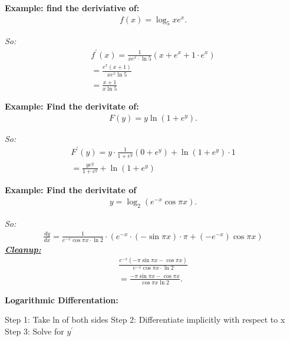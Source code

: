 \documentclass{report}
\begin{document}
  \bigbreak \noindent 
  \begin{mdframed}
    \textbf{Example: find the deriviative of: }
    \begin{align*}
      f(x) = \log_5{xe^{x}}
    .\end{align*}
  \end{mdframed}
  \bigbreak \noindent
  \textit{So:}
  \begin{align*}
    f^{\prime}(x) = \frac{1}{xe^{x}\cdot \ln{5}} (x+e^{x}+1\cdot e^{x}) \\ 
    = \frac{e^{x}(x+1)}{xe^{x}\ln{5}} \\ 
    = \frac{x+1}{x\ln{5}}
  \end{align*}

  \bigbreak \noindent 
  \begin{mdframed}
    \textbf{Example: Find the derivitate of:}
    \begin{align*}
      F(y) = y\ln{(1+e^{y})}
    .\end{align*}
  \end{mdframed}
  \bigbreak \noindent
  \textit{So:}
  \begin{align*}
   F^{\prime}(y) = y \cdot \frac{1}{1+e^{y}} (0+e^{y})  + \ln{(1+e^{y})} \cdot 1 \\ 
   = \frac{ye^{y}}{1+e^{y}} + \ln{(1+e^{y})}
  \end{align*}
  \bigbreak \noindent 

  \bigbreak \noindent 
  \begin{mdframed}
    \textbf{Example: Find the derivitate of}
    \begin{align*}
      y = \log_2{(e^{-x}\cos{\pi x})}
    .\end{align*}
  \end{mdframed}
  \bigbreak \noindent
  \textit{So:}
  \begin{align*}
    \frac{dy}{dx} = \frac{1}{e^{-x}\cos{\pi x} \cdot \ln{2}} \cdot (e^{-x} \cdot (-\sin{\pi x}) \cdot \pi + (-e^{-x}) \cos{\pi x}) 
  \end{align*}
  \bigbreak \noindent 
  \textbf{\textit{\underline{Cleanup:}}}
  \begin{align*}
    \frac{e^{-x}(-\pi \sin{\pi x} - \cos{\pi x})}{e^{-x}\cos{\pi x} \cdot \ln{2}} \\
    = \frac{-\pi \sin{\pi x} - \cos{\pi x}}{\cos{\pi x} \ln{2}}
  .\end{align*}
  
  \pagebreak \bigbreak \noindent
  \begin{large}
    \textbf{Logarithmic Differentation:}
  \end{large}
  \bigbreak \noindent 
  Step 1: Take ln of both sides 
  \bigbreak \noindent 
  Step 2: Differentiate implicitly with respect to x
  \bigbreak \noindent 
  Step 3: Solve for $y^{\prime}$
\end{document}
